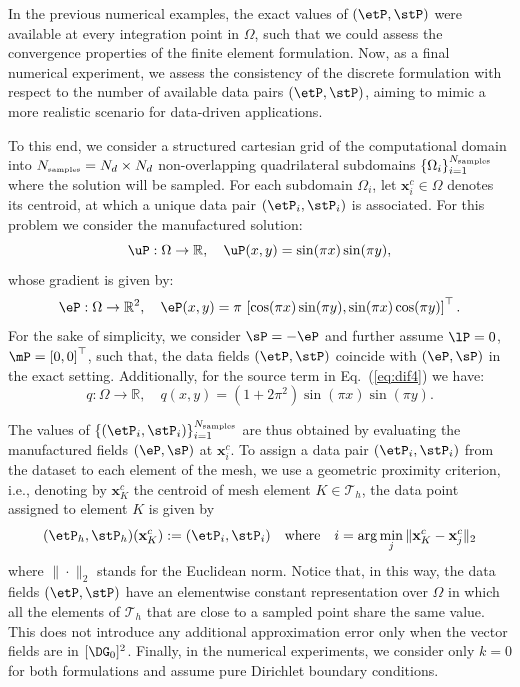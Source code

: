 In the previous numerical examples, the exact values of $ (\etP, \stP) $ were available at every integration point in $\Omega$, such that we could assess the convergence
properties of the finite element formulation. 
Now, as a final numerical experiment, we assess the consistency of the discrete 
formulation with respect to the number of available data pairs $ (\etP, \stP) $, aiming 
to mimic a more realistic scenario for data-driven applications. 

To this end, we consider a structured cartesian grid of the computational domain into $N_{\mbox{\tiny samples}} = N_d \times N_d$ non-overlapping quadrilateral subdomains $ \{\Omega_i\}_{i=1}^{N_{\mbox{\tiny samples}}} $ where the solution will be sampled. For each subdomain $ \Omega_i $, let $\mathbf{x}_{i}^{c} \in \Omega$ denotes its centroid, at which a unique data pair $(\etP_i, \stP_i)$ is associated. For this problem we consider the manufactured solution: 
\begin{equation}
	\uP: \Omega \rightarrow \mathbb{R}, \quad \uP(x,y) = \sin(\pi x)\sin(\pi y),
\end{equation}
whose gradient is given by:
\begin{equation}
	\eP: \Omega \rightarrow \mathbb{R}^{2}, \quad \eP(x,y) = \pi \, \left[\cos(\pi x)\sin(\pi y), \sin(\pi x)\cos(\pi y) \right]^{\top}.
\end{equation}
For the sake of simplicity, we consider $ \sP = -\eP $ and further assume $\lP  = 0$, $ \mP = \left[0,0\right]^{\top}$,
such that, the data fields $(\etP, \stP)$ coincide with $(\eP, \sP)$ in the exact setting. 
Additionally, for the source term in Eq.~(\ref{eq:dif4}) we have: 
$$
q: \Omega \rightarrow \mathbb{R}, \quad q(x,y) = \left(1 + 2\pi^2 \right)\sin(\pi x)\sin(\pi y).
$$

The values of $\{(\etP_i, \stP_i)\}_{i=1}^{N_{\mbox{\tiny samples}}}$ are thus obtained by evaluating the manufactured fields $(\eP, \sP)$ at $\mathbf{x}_{i}^{c}$. To assign a data pair $ (\etP_i, \stP_i) $ from the dataset to each element of the mesh, we use a geometric proximity criterion, i.e., denoting by $ \mathbf{x}_K^{c} $ the centroid of mesh 
element $ K \in \mathcal{T}_h $, the data point assigned to element $K$ is given by
\begin{equation}
	(\etP_h, \stP_h)(\mathbf{x}_{K}^{c}) := (\etP_i, \stP_i) \quad \text{where} \quad i = \arg\min_{j} \| \mathbf{x}_K^{c} - \mathbf{x}_{j}^{c} \|_2
\end{equation}
where $\| \cdot \|_2$ stands for the Euclidean norm. Notice that, in this way, the data fields $(\etP, \stP)$
have an elementwise constant representation over $\Omega$ in which all the elements of
$\mathcal{T}_h$ that are close to a sampled point share the same value. 
This does not introduce any additional
approximation error only when the vector fields are in $[\DG_0]^2$.
Finally, in the numerical experiments, we consider only $ k=0 $ for both formulations 
and assume pure Dirichlet boundary conditions.

